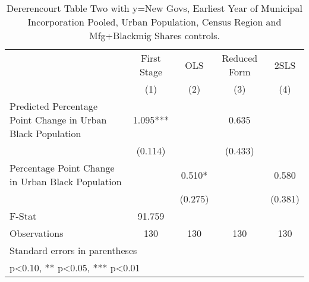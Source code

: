\begin{table}[htbp]\centering
\def\sym#1{\ifmmode^{#1}\else\(^{#1}\)\fi}
\caption{Dererencourt Table Two with y=New Govs, Earliest Year of Municipal Incorporation  Pooled, Urban Population, Census Region and Mfg+Blackmig Shares controls.}
\begin{tabular}{l*{4}{c}}
\toprule
                    & First Stage   &         OLS   &Reduced Form   &        2SLS   \\
                    &\multicolumn{1}{c}{(1)}   &\multicolumn{1}{c}{(2)}   &\multicolumn{1}{c}{(3)}   &\multicolumn{1}{c}{(4)}   \\
\midrule
Predicted Percentage Point Change in Urban Black Population&       1.095***&               &       0.635   &               \\
                    &     (0.114)   &               &     (0.433)   &               \\
\addlinespace
Percentage Point Change in Urban Black Population&               &       0.510*  &               &       0.580   \\
                    &               &     (0.275)   &               &     (0.381)   \\
\midrule
F-Stat              &      91.759   &               &               &               \\
Observations        &         130   &         130   &         130   &         130   \\
\bottomrule
\multicolumn{5}{l}{\footnotesize Standard errors in parentheses}\\
\multicolumn{5}{l}{\footnotesize * p<0.10, ** p<0.05, *** p<0.01}\\
\end{tabular}
\end{table}
